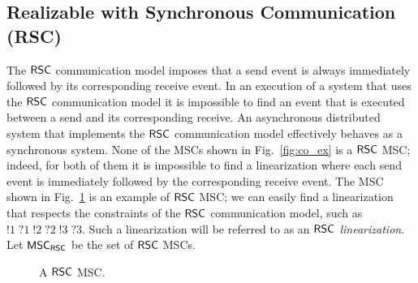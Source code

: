 \subsection{Realizable with Synchronous Communication (RSC)}
The $\mathsf{RSC}$ communication model imposes that a send event is always immediately followed by its corresponding receive event. In an execution of a system that uses the $\mathsf{RSC}$ communication model it is impossible to find an event that is executed between a send and its corresponding receive. An asynchronous distributed system that implements the $\mathsf{RSC}$ communication model effectively behaves as a synchronous system. None of the MSCs shown in Fig.~\ref{fig:co_ex} is a $\mathsf{RSC}$ MSC; indeed, for both of them it is impossible to find a linearization where each send event is immediately followed by the corresponding receive event. The MSC shown in Fig.~\ref{fig:rsc_ex} is an example of $\mathsf{RSC}$ MSC; we can easily find a linearization that respects the constraints of the $\mathsf{RSC}$ communication model, such as $!1\;?1\;!2\;?2\;!3\;?3$. Such a linearization will be referred to as an \emph{$\mathsf{RSC}$ linearization}. Let $\mathsf{MSC}_{\mathsf{RSC}}$ be the set of $\mathsf{RSC}$ MSCs.

\begin{figure}[h]
	\begin{center}
		\caption{A $\mathsf{RSC}$ MSC.}
		\label{fig:rsc_ex}
	\end{center}
\end{figure}

